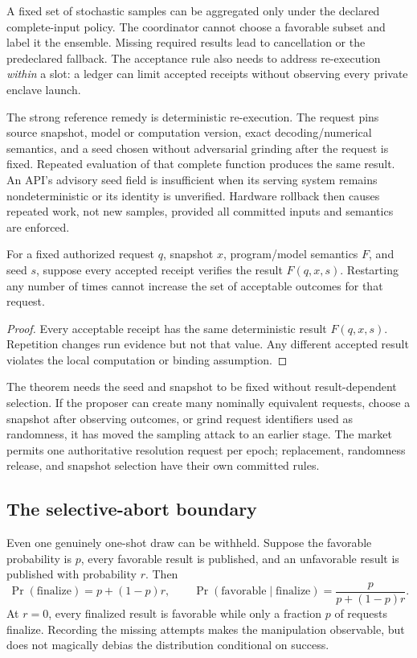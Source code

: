 A fixed set of stochastic samples can be aggregated only under the declared complete-input policy. The coordinator cannot choose a favorable subset and label it the ensemble. Missing required results lead to cancellation or the predeclared fallback. The acceptance rule also needs to address re-execution \emph{within} a slot: a ledger can limit accepted receipts without observing every private enclave launch.

The strong reference remedy is deterministic re-execution. The request pins source snapshot, model or computation version, exact decoding/numerical semantics, and a seed chosen without adversarial grinding after the request is fixed. Repeated evaluation of that complete function produces the same result. An API's advisory seed field is insufficient when its serving system remains nondeterministic or its identity is unverified. Hardware rollback then causes repeated work, not new samples, provided all committed inputs and semantics are enforced.

\begin{proposition}
For a fixed authorized request $q$, snapshot $x$, program/model semantics $F$, and seed $s$, suppose every accepted receipt verifies the result $F(q,x,s)$. Restarting any number of times cannot increase the set of acceptable outcomes for that request.
\end{proposition}
\begin{proof}
Every acceptable receipt has the same deterministic result $F(q,x,s)$. Repetition changes run evidence but not that value. Any different accepted result violates the local computation or binding assumption.
\end{proof}

The theorem needs the seed and snapshot to be fixed without result-dependent selection. If the proposer can create many nominally equivalent requests, choose a snapshot after observing outcomes, or grind request identifiers used as randomness, it has moved the sampling attack to an earlier stage. The market permits one authoritative resolution request per epoch; replacement, randomness release, and snapshot selection have their own committed rules.

\subsection{The selective-abort boundary}

Even one genuinely one-shot draw can be withheld. Suppose the favorable probability is $p$, every favorable result is published, and an unfavorable result is published with probability $r$. Then
\[
\Pr(\mathrm{finalize})=p+(1-p)r,\qquad
\Pr(\mathrm{favorable}\mid\mathrm{finalize})=
\frac{p}{p+(1-p)r}.
\]
At $r=0$, every finalized result is favorable while only a fraction $p$ of requests finalize. Recording the missing attempts makes the manipulation observable, but does not magically debias the distribution conditional on success.

